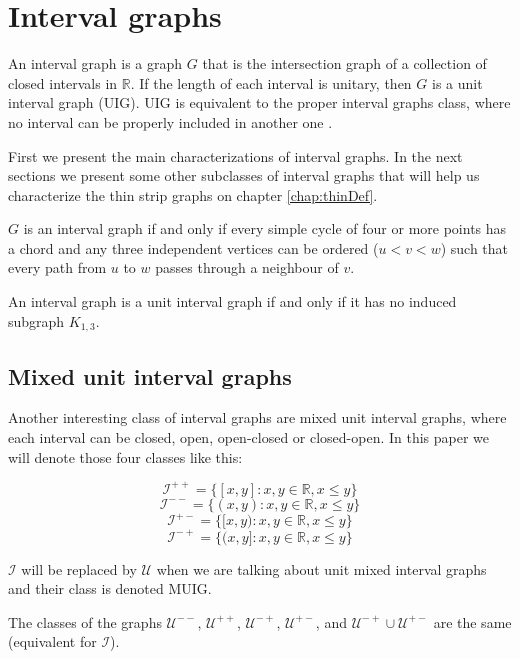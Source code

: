 \chapter{Interval graphs}

An interval graph is a graph $G$ that is the intersection graph of a collection
of closed intervals in $\mathbb{R}$. If the length of each interval is unitary,
then $G$ is a unit interval graph (UIG). UIG is equivalent to the proper interval graphs class, where no interval can be properly included in another one .

First we present the main characterizations of interval graphs. In the next sections we present some other subclasses of interval graphs that will help us characterize the thin strip graphs on chapter \ref{chap:thinDef}.

\begin{theorem}
  \label{theo:intervalChord}
  $G$ is an interval graph if and only if every simple cycle of four or more
  points has a chord and any three independent vertices can be ordered ($u<v<w$) such that every path from $u$ to $w$ passes through a neighbour of $v$.
\end{theorem}

\begin{theorem}
  An interval graph is a unit interval graph if and only if it has no induced subgraph $K_{1,3}$.
\end{theorem}

\section{Mixed unit interval graphs}
\label{sec:muig}

Another interesting class of interval graphs are mixed unit interval graphs, where each
interval can be closed, open, open-closed or closed-open. In this paper we will
denote those four classes like this:

$$\mathcal{I}^{++} = \{[x,y] : x,y \in \mathbb{R}, x\leq y\}$$
$$\mathcal{I}^{--} = \{(x,y) : x,y \in \mathbb{R}, x\leq y\}$$
$$\mathcal{I}^{+-} = \{[x,y) : x,y \in \mathbb{R}, x\leq y\}$$
$$\mathcal{I}^{-+} = \{(x,y] : x,y \in \mathbb{R}, x\leq y\}$$

$\mathcal{I}$ will be replaced by $\mathcal{U}$ when we are talking about unit
mixed interval graphs and their class is denoted MUIG.

\begin{theorem}
  The classes of the graphs $\mathcal{U}^{--}$, $\mathcal{U}^{++}$,
  $\mathcal{U}^{-+}$, $\mathcal{U}^{+-}$, and  $\mathcal{U}^{-+} \cup
  \mathcal{U}^{+-}$ are the same (equivalent for $\mathcal{I}$). \cite{DOURADO20123357}
\end{theorem}

